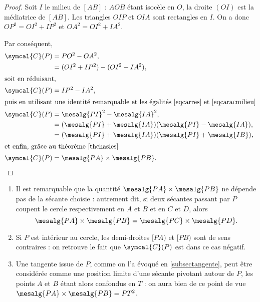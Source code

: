 \begin{figure}[ht]
\centering
{}
\figcaption{}\label{figsecante}
\end{figure}

\begin{proof}
Soit $I$ le milieu de $[AB]$ : $AOB$ étant isocèle en $O$, la droite $(OI)$ est la médiatrice de $[AB]$. Les triangles $OIP$ et $OIA$ sont rectangles en $I$. On a donc $OP^2=OI^2+IP^2$ et $OA^2=OI^2+IA^2$.

 Par conséquent,
\begin{align*}
\symcal{C}(P)&=PO^2-OA^2,\\
&=(OI^2+IP^2)-(OI^2+IA^2),\\
\intertext{soit en réduisant,}
\symcal{C}(P)&=IP^2-IA^2,\\
\intertext{puis en utilisant une identité remarquable et les égalités~\eqref{eqcarres} et~\eqref{eqcaracmilieu}}
\symcal{C}(P)&=\mesalg{PI}^2-\mesalg{IA}^2,\\
&=(\mesalg{PI}+\mesalg{IA})(\mesalg{PI}-\mesalg{IA}),\\
&=(\mesalg{PI}+\mesalg{IA})(\mesalg{PI}+\mesalg{IB}),\\
\intertext{et enfin, grâce au théorème~\ref{thchasles}}
\symcal{C}(P)&=\mesalg{PA}\times\mesalg{PB}.\qedhere
\end{align*}

\end{proof}

\begin{example}[Remarques]
\begin{enumerate}
\item Il est remarquable que la quantité $\mesalg{PA}\times\mesalg{PB}$ ne dépende pas de la sécante choisie : autrement dit, si deux sécantes passant par $P$ coupent le cercle respectivement en $A$ et $B$ et en $C$ et $D$, alors
\[\mesalg{PA}\times\mesalg{PB}=\mesalg{PC}\times\mesalg{PD}.\]
\item Si $P$ est intérieur au cercle, les demi-droites $[PA)$ et $[PB)$ sont de sens contraires : on retrouve le fait que $\symcal{C}(P)$ est dans ce cas négatif.
\item Une tangente issue de $P$, comme on l'a évoqué en \ref{subsectangente}, peut être considérée comme une position limite d'une sécante pivotant autour de $P$, les points $A$ et $B$ étant alors confondus en $T$ : on aura bien de ce point de vue $\mesalg{PA}\times\mesalg{PB}=PT^2$.
\end{enumerate}
\end{example} 

